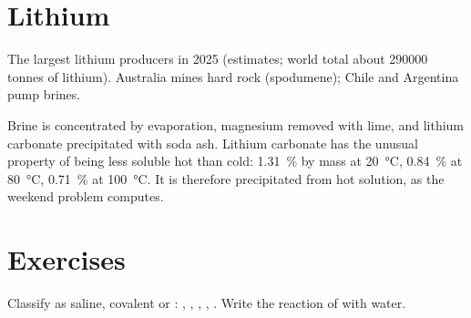 \section{Lithium}

\begin{omfigure}

{\small The largest lithium producers in 2025 (estimates; world total
about \num{290000} tonnes of lithium). Australia mines hard rock
(spodumene); Chile and Argentina pump brines.}
\end{omfigure}

Brine is concentrated by evaporation, magnesium removed with lime, and
lithium carbonate precipitated with soda ash. Lithium carbonate has the
unusual property of being less soluble hot than cold: \qty{1.31}{\percent}
by mass at \qty{20}{\celsius}, \qty{0.84}{\percent} at \qty{80}{\celsius},
\qty{0.71}{\percent} at \qty{100}{\celsius}. It is therefore precipitated
from hot solution, as the weekend problem computes.

\section{Exercises}

\begin{exercise}[$\star$]\label{exo:b1:s-block:1}
Classify as saline, covalent or : , ,
, , . Write the reaction of  with water.
\end{exercise}

